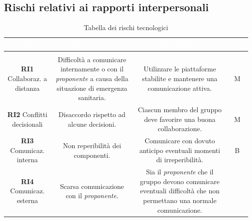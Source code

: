\vspace{-1cm}
\subsection{Rischi relativi ai rapporti interpersonali}
\begin{center}
\begin{longtable}{C{\colA} | C{\colB} | C{\colC} | C{\colD}}
		\textcolor{white}{\textbf{Codice}} & 
		\textcolor{white}{\textbf{Descrizione}} & 
		\textcolor{white}{\textbf{Identificazione}} & 
		\textcolor{white}{\textbf{Occ.}} \\
		\endfirsthead
	    \\
	    \endfoot
	    \caption{Tabella dei rischi tecnologici}
	    \endlastfoot

\textbf{RI1} \newline Collaboraz. a distanza &

Difficoltà a comunicare internamente o con il \textit{proponente} a causa della situazione di emergenza sanitaria. & 

Utilizzare le piattaforme stabilite e mantenere una comunicazione attiva.  & 

M \\
\textbf{RI2} \newline Conflitti decisionali &

Disaccordo rispetto ad alcune decisioni. & 

Ciascun membro del gruppo deve favorire una buona collaborazione.  & 

M \\
\textbf{RI3} \newline Comunicaz. interna &

Non reperibilità dei componenti. & 

Comunicare con dovuto anticipo eventuali momenti di irreperibilità.  & 

B \\

\textbf{RI4} \newline Comunicaz. esterna &

Scarsa comunicazione con il \textit{proponente}. & 

Sia il \textit{proponente} che il gruppo devono comunicare eventuali difficoltà che non permettano una normale comunicazione.  & 


\end{longtable}
\end{center}
